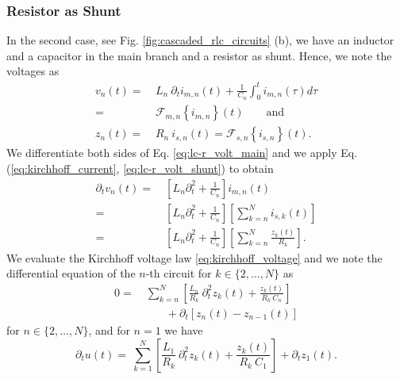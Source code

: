 \documentclass[a4paper, 10pt, twoside, twocolumn]{scrartcl}
\begin{document}

\subsubsection*{Resistor as Shunt}
In the second case, see Fig. \ref{fig:cascaded_rlc_circuits} (b), we have an inductor and a capacitor in the main branch and a resistor as shunt. Hence, we note the voltages as 
\begin{align} %
	v_{n}(t) =&~ L_n ~ \partial_{t} i_{m,n}(t) + \frac{1}{C_{n}} \int_{0}^{t} i_{m,n}(\tau) d\tau \nonumber \\
	=&~ \mathcal{F}_{m,n} \left\{i_{m,n}\right\}(t) \qquad\text{and} \label{eq:lc-r_volt_main} \\
	z_{n}(t) =&~ R_n ~ i_{s,n}(t)  = \mathcal{F}_{s,n} \left\{i_{s,n}\right\}(t) \text{.} \label{eq:lc-r_volt_shunt}
\end{align}
We differentiate both sides of Eq. \eqref{eq:lc-r_volt_main} and we apply Eq. (\ref{eq:kirchhoff_current}, \eqref{eq:lc-r_volt_shunt}) to obtain
\begin{align*}
	\partial_{t} v_{n}(t) =&~ \left[L_n \partial_{t}^2 + \frac{1}{C_{n}}\right] i_{m,n}(t) \\
	=&~ \left[L_n \partial_{t}^2 + \frac{1}{C_{n}}\right] \left[  \sum_{k=n}^{N} i_{s,k}(t)  \right] \\
	=&~ \left[L_n \partial_{t}^2 + \frac{1}{C_{n}}\right] \left[  \sum_{k=n}^{N} \frac{z_{k}(t)}{R_{k}} \right] \text{.}
\end{align*}
We evaluate the Kirchhoff voltage law \eqref{eq:kirchhoff_voltage} and we  note the differential equation of the $n$-th circuit 
for  $k\in\{2,\ldots,N\}$ as 
\begin{align}
	0 =&~ \sum_{k=n}^{N} \left[ \frac{L_{n}}{R_{k}} ~ \partial_{t}^2 z_{k}(t) + \frac{z_{k}(t)}{R_{k}~C_{n}} \right] \\
	&\qquad   + \partial_{t} \left[z_{n}(t) - z_{n-1}(t)\right] \label{eq:lc-r_shunt_ode_n}
\end{align}
for $n\in\{2,\ldots,N\}$, and for $n=1$ we have
\begin{equation}
	\partial_{t} u(t) =~ \sum_{k=1}^{N} \left[ \frac{L_{1}}{R_{k}} ~ \partial_{t}^2 z_{k}(t) + \frac{z_{k}(t)}{R_{k}~C_{1}} \right] + \partial_{t} z_{1}(t) \text{.} \label{eq:lc-r_shunt_ode_0}
\end{equation}
\end{document}
